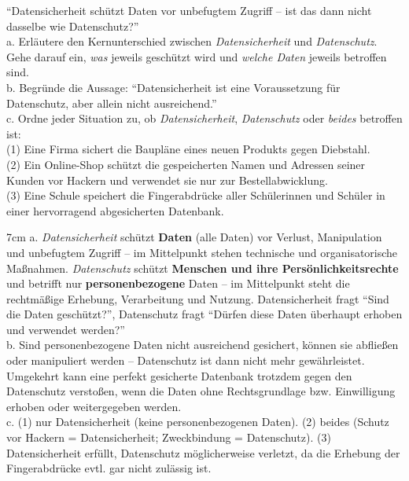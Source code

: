 \question[5]
\enquote{Datensicherheit schützt Daten vor unbefugtem Zugriff -- ist das dann nicht dasselbe wie Datenschutz?} \\
a. Erläutere den Kernunterschied zwischen \textit{Datensicherheit} und \textit{Datenschutz}. Gehe darauf ein,
\textit{was} jeweils geschützt wird und \textit{welche Daten} jeweils betroffen sind. \\
b. Begründe die Aussage: \enquote{Datensicherheit ist eine Voraussetzung für Datenschutz, aber allein nicht
ausreichend.} \\
c. Ordne jeder Situation zu, ob \textit{Datensicherheit}, \textit{Datenschutz} oder \textit{beides} betroffen ist: \\
\hspace*{1em} (1) Eine Firma sichert die Baupläne eines neuen Produkts gegen Diebstahl. \\
\hspace*{1em} (2) Ein Online-Shop schützt die gespeicherten Namen und Adressen seiner Kunden vor Hackern
und verwendet sie nur zur Bestellabwicklung. \\
\hspace*{1em} (3) Eine Schule speichert die Fingerabdrücke aller Schülerinnen und Schüler in einer
hervorragend abgesicherten Datenbank.

\begin{solutionbox}{7cm}
a. \textit{Datensicherheit} schützt \textbf{Daten} (alle Daten) vor Verlust, Manipulation und unbefugtem
Zugriff -- im Mittelpunkt stehen technische und organisatorische Maßnahmen. \textit{Datenschutz} schützt
\textbf{Menschen und ihre Persönlichkeitsrechte} und betrifft nur \textbf{personenbezogene} Daten -- im
Mittelpunkt steht die rechtmäßige Erhebung, Verarbeitung und Nutzung. Datensicherheit fragt
\enquote{Sind die Daten geschützt?}, Datenschutz fragt \enquote{Dürfen diese Daten überhaupt erhoben
und verwendet werden?} \\
b. Sind personenbezogene Daten nicht ausreichend gesichert, können sie abfließen oder manipuliert werden
-- Datenschutz ist dann nicht mehr gewährleistet. Umgekehrt kann eine perfekt gesicherte Datenbank
trotzdem gegen den Datenschutz verstoßen, wenn die Daten ohne Rechtsgrundlage bzw. Einwilligung
erhoben oder weitergegeben werden. \\
c. (1) nur Datensicherheit (keine personenbezogenen Daten). \quad
(2) beides (Schutz vor Hackern = Datensicherheit; Zweckbindung = Datenschutz). \quad
(3) Datensicherheit erfüllt, Datenschutz möglicherweise verletzt, da die Erhebung der Fingerabdrücke
evtl. gar nicht zulässig ist.
\end{solutionbox}
